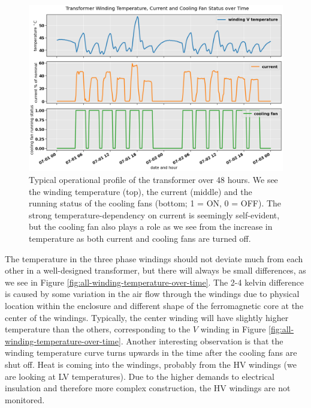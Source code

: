 \documentclass[]{article}
\begin{document}
\begin{figure}[!h]
	\centering
	\includegraphics[width=1\linewidth]{./figs/temp-current-aux.png}
	\caption{Typical operational profile of the transformer over 48 hours. We see the winding temperature (top), the current (middle) and the running status of the cooling fans (bottom; 1 = ON, 0 = OFF). The strong temperature-dependency on current is seemingly self-evident, but the cooling fan also plays a role as we see from the increase in temperature as both current and cooling fans are turned off.}
	\label{fig:temp-current-aux}
\end{figure}

The temperature in the three phase windings should not deviate much from each other in a well-designed transformer, but there will always be small differences, as we see in Figure \ref{fig:all-winding-temperature-over-time}. The 2-4 kelvin difference is caused by some variation in the air flow through the windings due to physical location within the enclosure and different shape of the ferromagnetic core at the center of the windings. Typically, the center winding will have slightly higher temperature than the others, corresponding to the $V$ winding in Figure \ref{fig:all-winding-temperature-over-time}. Another interesting observation is that the winding temperature curve turns upwards in the time after the cooling fans are shut off. Heat is coming into the windings, probably from the HV windings (we are looking at LV temperatures). Due to the higher demands to electrical insulation and therefore more complex construction, the HV windings are not monitored.
\end{document}
